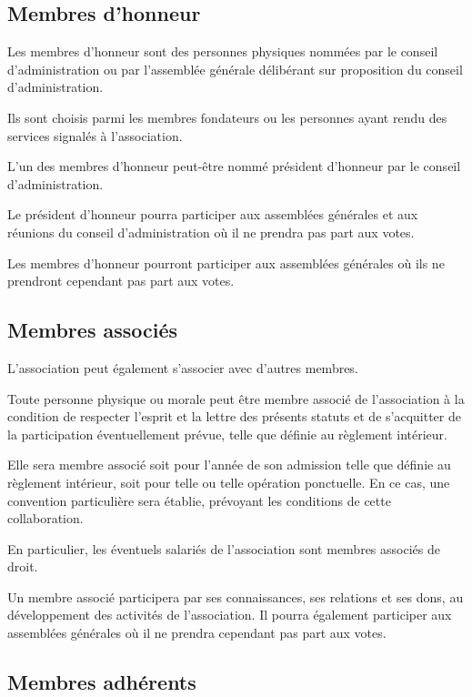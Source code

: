 \documentclass[a4wide,12pt]{scrartcl}
\begin{document}
\subsection{Membres d'honneur}

Les membres d'honneur sont des personnes physiques nommées par le
conseil d'administration ou par l'assemblée générale délibérant sur
proposition du conseil d'administration.

Ils sont choisis parmi les membres fondateurs ou les personnes ayant
rendu des services signalés à l'association.

L'un des membres d'honneur peut-être nommé président d'honneur par le
conseil d'administration.

Le président d'honneur pourra participer aux assemblées générales et
aux réunions du conseil d'administration où il ne prendra pas part aux
votes.

Les membres d'honneur pourront participer aux assemblées générales où
ils ne prendront cependant pas part aux votes.

\subsection{Membres associés}

L'association peut également s'associer avec d'autres membres.

Toute personne physique ou morale peut être membre associé de
l'association à la condition de respecter l'esprit et la lettre des
présents statuts et de s'acquitter de la participation éventuellement
prévue, telle que définie au règlement intérieur.

Elle sera membre associé soit pour l'année de son admission telle que
définie au règlement intérieur, soit pour telle ou telle opération
ponctuelle.  En ce cas, une convention particulière sera établie,
prévoyant les conditions de cette collaboration.

En particulier, les éventuels salariés de l'association sont membres
associés de droit.

Un membre associé participera par ses connaissances, ses relations et
ses dons, au développement des activités de l'association. Il pourra
également participer aux assemblées générales où il ne prendra
cependant pas part aux votes.

\subsection{Membres adhérents}
\end{document}
